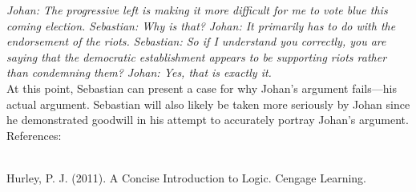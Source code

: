 \documentclass[a4paper,12pt,single,pdftex]{scrbook}
\begin{document}
    
      {\em Johan: The progressive left is making it more difficult for me to vote blue this coming election.} \newline
{\em Sebastian: Why is that?} \newline
{\em Johan: It primarily has to do with the endorsement of the riots.} \newline
{\em Sebastian: So if I understand you correctly, you are saying that the democratic establishment appears to be supporting riots rather than condemning them?} \newline
{\em Johan: Yes, that is exactly it.}
    \\

    
      At this point, Sebastian can present a case for why Johan’s argument fails—his actual argument. Sebastian will also likely be taken more seriously by Johan since he demonstrated goodwill in his attempt to accurately portray Johan’s argument.
    \\

    References:

    
      
        
      \\

      
        Hurley, P. J. (2011). A Concise Introduction to Logic. Cengage Learning.
      \\

    
\end{document}
